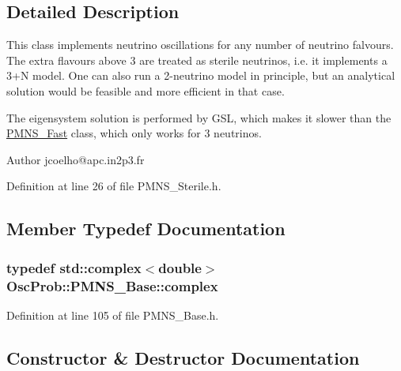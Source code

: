 \subsection{Detailed Description}
This class implements neutrino oscillations for any number of neutrino falvours. The extra flavours above 3 are treated as sterile neutrinos, i.\+e. it implements a 3+N model. One can also run a 2-\/neutrino model in principle, but an analytical solution would be feasible and more efficient in that case.

The eigensystem solution is performed by G\+SL, which makes it slower than the \hyperlink{classOscProb_1_1PMNS__Fast}{P\+M\+N\+S\+\_\+\+Fast} class, which only works for 3 neutrinos.

\begin{DoxyAuthor}{Author}
jcoelho@apc.\+in2p3.\+fr 
\end{DoxyAuthor}


Definition at line 26 of file P\+M\+N\+S\+\_\+\+Sterile.\+h.



\subsection{Member Typedef Documentation}
\subsubsection[{\texorpdfstring{complex}{complex}}]{\setlength{\rightskip}{0pt plus 5cm}typedef std\+::complex$<$double$>$ {\bf Osc\+Prob\+::\+P\+M\+N\+S\+\_\+\+Base\+::complex}\hspace{0.3cm}{\ttfamily [inherited]}}\hypertarget{classOscProb_1_1PMNS__Base_ae86ec4718808ce9d02e5f5b4226714ab}{}\label{classOscProb_1_1PMNS__Base_ae86ec4718808ce9d02e5f5b4226714ab}


Definition at line 105 of file P\+M\+N\+S\+\_\+\+Base.\+h.



\subsection{Constructor \& Destructor Documentation}
